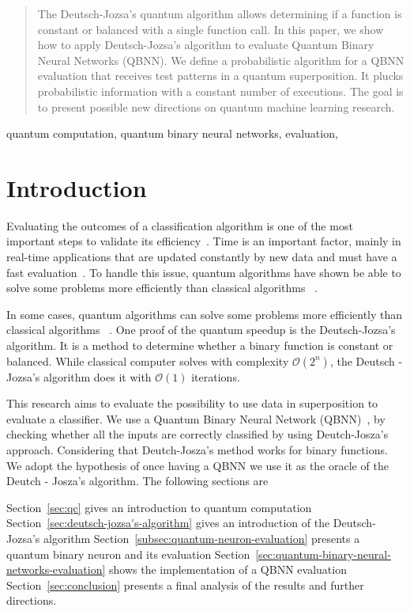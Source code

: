 \documentclass[conference]{IEEEtran}
\begin{document}
\begin{abstract}
The Deutsch-Jozsa's quantum algorithm allows determining if a function is constant or balanced with a single function call.
In this paper, we show how to apply Deutsch-Jozsa's algorithm to evaluate Quantum Binary Neural Networks (QBNN).
We define a probabilistic algorithm for a QBNN evaluation that receives test patterns in a quantum superposition.
It plucks probabilistic information with a constant number of executions.
The goal is to present possible new directions on quantum machine learning research.
\end{abstract}

\begin{IEEEkeywords}
quantum computation, quantum binary neural networks, evaluation,
\end{IEEEkeywords}

\section{Introduction}\label{sec:introduction}
Evaluating the outcomes of a classification algorithm is one of the most important steps to validate its
efficiency~\cite{japkowicz2006question}.
Time is an important factor, mainly in
real-time applications that are updated constantly by new data and must have a fast evaluation~\cite{chen2012classifier}.
To handle this issue, quantum algorithms have shown be able to solve some problems more efficiently than classical algorithms
~\cite{deutsch1992rapid}.

In some cases, quantum algorithms can solve some problems more efficiently than classical algorithms
~\cite{deutsch1992rapid}.
One proof of the quantum speedup is the Deutsch-Jozsa's algorithm.
It is a method to determine whether a binary function is constant or balanced.
While classical computer solves with complexity \(\mathcal{O}(2^{n})\),
the Deutsch - Jozsa's algorithm does it with \(\mathcal{O}(1)\) iterations.

This research aims to evaluate the possibility to use data in superposition to evaluate a classifier.
We use a Quantum Binary Neural Network (QBNN)~\cite{fawaz2019training}, by checking whether all the inputs are correctly classified by using Deutch-Josza's approach.
Considering that Deutch-Josza's method works for binary functions.
We adopt the hypothesis of once having a QBNN we use it as the oracle of the Deutch - Josza's algorithm.
The following sections are

Section~\ref{sec:qc} gives an introduction to quantum computation
Section~\ref{sec:deutsch-jozsa's-algorithm} gives an introduction of the Deutsch-Jozsa's algorithm
Section~\ref{subsec:quantum-neuron-evaluation} presents a quantum binary neuron and its evaluation
Section~\ref{sec:quantum-binary-neural-networks-evaluation} shows the implementation of a QBNN evaluation
Section~\ref{sec:conclusion} presents a final analysis of the results and further directions.
\end{document}
